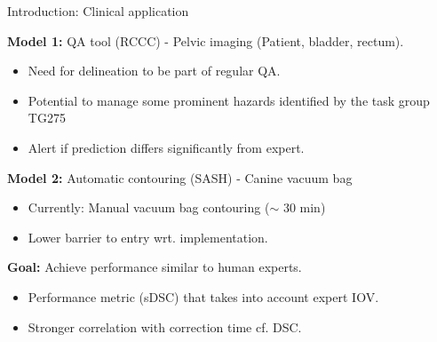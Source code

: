 \documentclass[9pt]{beamer}
\begin{document}
\begin{frame}{Introduction: Clinical application}

\textbf{Model 1:} QA tool (RCCC) - Pelvic imaging (Patient, bladder, rectum).
\begin{itemize}
\item Need for delineation to be part of regular QA.\footnotemark[4]
\item Potential to manage some prominent hazards identified by the task group TG275
\item Alert if prediction differs significantly from expert.

\end{itemize}
\vspace{4mm}

\textbf{Model 2:} Automatic contouring (SASH) - Canine vacuum bag
\begin{itemize}
\item Currently: Manual vacuum bag contouring ($\sim$ 30 min)
\item Lower barrier to entry wrt. implementation.
\end{itemize}
\vspace{3mm}

\textbf{Goal:} Achieve performance similar to human experts.
\begin{itemize}
\item Performance metric (sDSC) that takes into account expert IOV.\footnotemark[3]
\item Stronger correlation with correction time cf. DSC.\footnotemark[5]
\end{itemize}
\end{frame}
\end{document}
